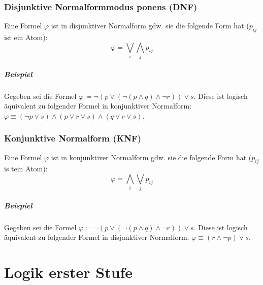         \subsection{Disjunktive Normalformmodus ponens (DNF)}
            Eine Formel $ \varphi $ ist in disjunktiver Normalform gdw. sie die folgende Form hat ($ p _ { ij } $ ist ein Atom):
            \begin{equation*}
                \varphi = \bigvee _ i \bigwedge _ j p _ { ij }
            \end{equation*}

            \paragraph{Beispiel}
                Gegeben sei die Formel $ \varphi \coloneqq \lnot (p \lor (\lnot (p \land q) \land \lnot r)) \lor s $. Diese ist logisch äquivalent zu folgender Formel in konjunktiver Normalform: $ \varphi \equiv (\lnot p \lor s) \land (p \lor r \lor s) \land (q \lor r \lor s) $.

        \subsection{Konjunktive Normalform (KNF)}
            Eine Formel $ \varphi $ ist in konjunktiver Normalform gdw. sie die folgende Form hat ($ p _ { ij } $ is tein Atom):
            \begin{equation*}
                \varphi = \bigwedge _ i \bigvee _ j p _ { ij }
            \end{equation*}

            \paragraph{Beispiel}
                Gegeben sei die Formel $ \varphi \coloneqq \lnot (p \lor (\lnot (p \land q) \land \lnot r)) \lor s $. Diese ist logisch äquivalent zu folgender Formel in disjunktiver Normalform: $ \varphi \equiv (r \land \lnot p) \lor s $.


\chapter{Logik erster Stufe}

